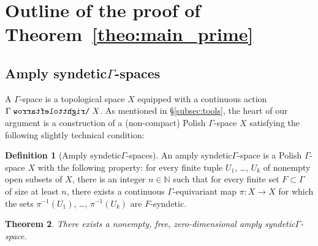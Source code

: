 \documentclass[11pt,reqno,psamsfonts]{amsart}
\theoremstyle{bfnote}
\newtheorem{theo}{Theorem}[section]
\theoremstyle{definition}
\newtheorem{defn}[theo]{Definition}
\theoremstyle{remark}
\newcommand{\0}{\varnothing}
\newcommand{\red}[1]{{\color{red}#1}}
\newcommand{\todo}[1]{\red{\textbf{\upshape{[#1]}}}}
\newcommand{\emphd}[1]{{\fontseries{b}\selectfont\textsf{#1}}}
\newcommand{\acts}{\mathrel{\reflectbox{$\righttoleftarrow$}}}
\newcommand{\G}{\Gamma}
\newcommand{\N}{\mathbb{N}}
\newcommand{\sr}{amply syndetic\xspace}
\newcommand{\Sr}{Amply syndetic\xspace}
\numberwithin{equation}{section}
\begin{document}
    \section{Outline of the proof of Theorem~\ref{theo:main_prime}}\label{sec:outline}

    \subsection{\Sr $\G$-spaces}\label{subsubsec:ample}

    
    
    
    A \emphd{$\G$-space} is a topological space $X$ equipped with a continuous action $\G \acts X$. As mentioned in \S\ref{subsec:tools}, the heart of our argument is a construction of a (non-compact) Polish $\G$-space $X$ %
    satisfying the following slightly technical condition: %

    \begin{defn}[\Sr $\G$-spaces]\label{defn:amply_syndetic}
        An \emphd{\sr $\G$-space} is a %
        Polish $\G$-space $X$ %
        with the following property: %
        for every finite tuple $U_1$, \ldots, $U_k$ of nonempty open subsets of $X$, there is an integer $n \in \N$ such that for every finite set $F \subset \G$ of size at least $n$, there exists a continuous $\G$-equivariant map $\pi \colon X \to X$ for which the sets $\pi^{-1}(U_1)$, \ldots, $\pi^{-1}(U_k)$ are $F$-syndetic. %
    \end{defn}

    \begin{tcolorbox}
    \begin{theo}\label{theo:rich}
        There exists a nonempty, free, zero-dimensional %
        \sr $\G$-space.
    \end{theo}
    \end{tcolorbox}
\end{document}

